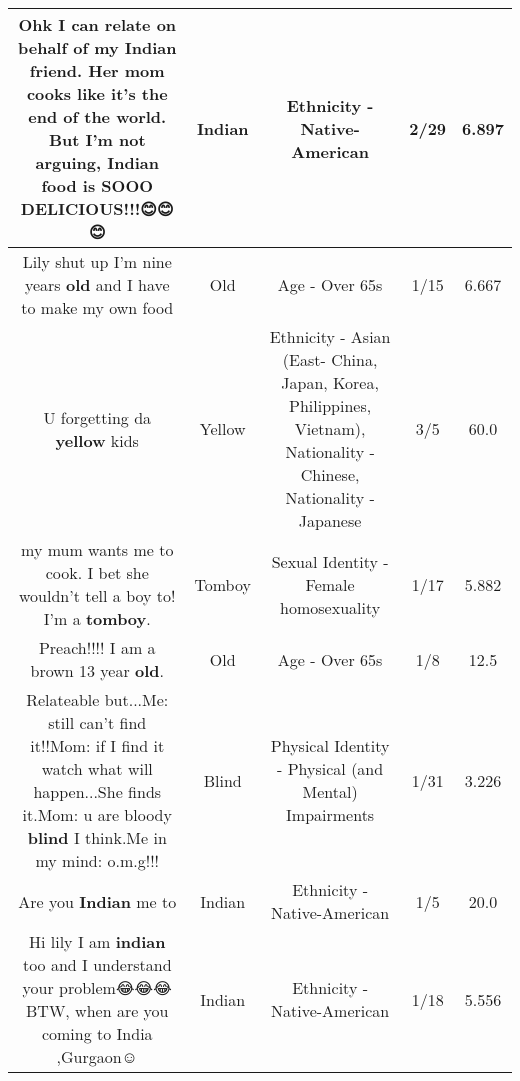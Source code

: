 \documentclass[11pt]{article}
\newlength\mylength
\begin{document}
\begin{center}
\begin{longtable}{|C{.65\mylength}|C{.30\mylength}|C{.12\mylength}|C{.12\mylength}|C{.12\mylength}|}
  \small Ohk  I can relate on behalf of my \textbf{Indian} friend. Her mom cooks like it's the end of the world. But I'm not arguing, \textbf{Indian} food is SOOO DELICIOUS!!!😊😊😊\normalsize   & Indian & Ethnicity - Native-American & 2/29 & 6.897 \\  \hline
  \small Lily shut up I'm nine years \textbf{old} and I have to make my own food\normalsize   & Old & Age - Over 65s & 1/15 & 6.667 \\  \hline
  \small U forgetting da \textbf{y\textbf{e\textbf{llow}}} kids\normalsize   & Yellow & Ethnicity - Asian (East- China, Japan, Korea, Philippines, Vietnam), Nationality - Chinese, Nationality - Japanese & 3/5 & 60.0 \\  \hline
  \small my mum wants me to cook. I bet she wouldn't tell a boy to! I'm a \textbf{tomboy}.\normalsize   & Tomboy & Sexual Identity - Female homosexuality & 1/17 & 5.882 \\  \hline
  \small Preach!!!! I am a brown 13 year \textbf{old}.\normalsize   & Old & Age - Over 65s & 1/8 & 12.5 \\  \hline
  \small Relateable but...Me: still can't find it!!Mom: if I find it watch what will happen...She finds it.Mom: u are bloody \textbf{blind} I think.Me in my mind: o.m.g!!!\normalsize   & Blind & Physical Identity - Physical (and Mental) Impairments & 1/31 & 3.226 \\  \hline
  \small Are you \textbf{Indian} me to\normalsize   & Indian & Ethnicity - Native-American & 1/5 & 20.0 \\  \hline
  \small Hi lily I am \textbf{indian} too and I understand your problem😂😂😂BTW, when are you coming to India ,Gurgaon☺️\normalsize   & Indian & Ethnicity - Native-American & 1/18 & 5.556 \\  \hline

\end{longtable}
\end{center}
\end{document}

